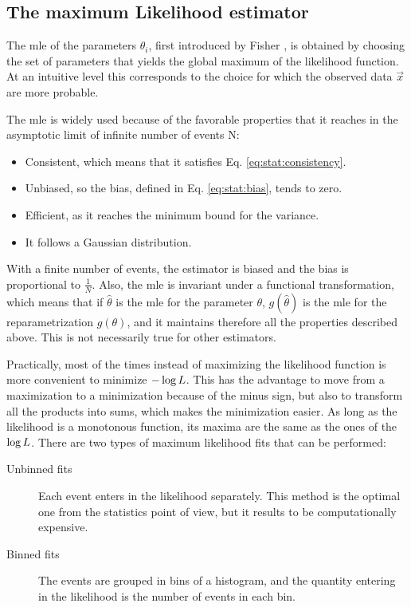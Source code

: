 \subsection{The maximum Likelihood estimator}
\label{sec:stat:MLE}

The \gls{mle} of the parameters $\theta_i$, first introduced by Fisher \cite{fisher1911absolute,aldrich1997}, is obtained by choosing the set of parameters that yields the global maximum of the likelihood function. At an intuitive level this corresponds to the choice for which the observed data $\vec{x}$ are more probable. 

The \gls{mle} is widely used because of the favorable properties that it reaches in the asymptotic limit of infinite number of events N:
\begin{itemize}
\item Consistent, which means that it satisfies Eq. \ref{eq:stat:consistency}.
\item Unbiased, so the bias, defined in Eq. \ref{eq:stat:bias}, tends to zero.
\item Efficient, as it reaches the minimum bound for the variance.
\item It follows a Gaussian distribution.
\end{itemize}

\noindent With a finite number of events, the estimator is biased and the bias is proportional to $\frac{1}{N}$. Also, the \gls{mle} is invariant under a functional transformation, which means that if $\hat{\theta}$ is the \gls{mle} for the parameter $\theta$, $g(\hat{\theta})$ is the \gls{mle} for the reparametrization $g(\theta)$, and it maintains therefore all the properties described above. This is not necessarily true for other estimators.

Practically, most of the times instead of maximizing the likelihood function is more convenient to minimize $-\log{L}$. This has the advantage to move from a maximization to a minimization because of the minus sign, but also to transform all the products into sums, which makes the minimization easier. As long as the likelihood is a monotonous function, its maxima are the same as the ones of the $\log{L}$.
There are two types of maximum likelihood fits that can be performed:

\begin{description}
\item[Unbinned fits] Each event enters in the likelihood separately. This method is the optimal one from the statistics point of view, but it results to be computationally expensive.
\item[Binned fits] The events are grouped in bins of a histogram, and the quantity entering in the likelihood is the number of events in each bin.
\end{description}

